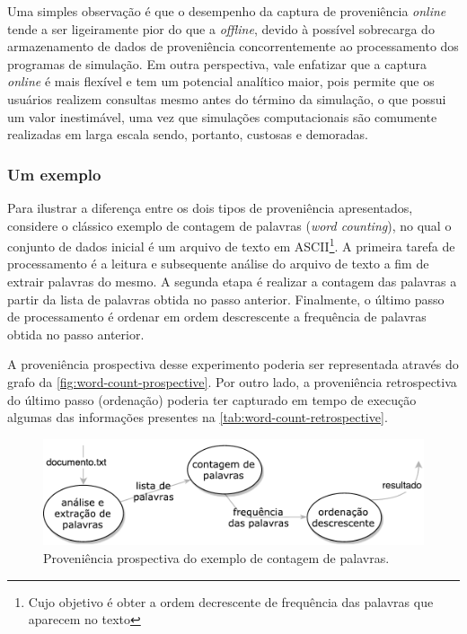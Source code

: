 Uma simples observação é que o desempenho da captura de proveniência \textit{online} tende a ser ligeiramente pior do que a \textit{offline}, devido à possível sobrecarga do armazenamento de dados de proveniência concorrentemente ao processamento dos programas de simulação. Em outra perspectiva, vale enfatizar que a captura \textit{online} é mais flexível e tem um potencial analítico maior, pois permite que os usuários realizem consultas mesmo antes do término da simulação, o que possui um valor inestimável, uma vez que simulações computacionais são comumente realizadas em larga escala sendo, portanto, custosas e demoradas.

\subsubsection{Um exemplo}

Para ilustrar a diferença entre os dois tipos de proveniência apresentados, considere o clássico exemplo de contagem de palavras (\textit{word counting}), no qual o conjunto de dados inicial é um arquivo de texto em  ASCII\footnote{Cujo objetivo é obter a ordem decrescente de frequência das palavras que aparecem no texto}. A primeira tarefa de processamento é a leitura e subsequente análise do arquivo de texto a fim de extrair palavras do mesmo. A segunda etapa é realizar a contagem das palavras a partir da lista de palavras obtida no passo anterior. Finalmente, o último passo de processamento é ordenar em ordem descrescente a frequência de palavras obtida no passo anterior.

A proveniência prospectiva desse experimento poderia ser representada através do grafo da \autoref{fig:word-count-prospective}. Por outro lado, a proveniência retrospectiva do último passo (ordenação) poderia ter capturado em tempo de execução algumas das informações presentes na \autoref{tab:word-count-retrospective}.

\begin{figure}[ht]
    \centering
    \includegraphics[width=\textwidth]{img/word-count-prospective}
    \caption[Proveniência prospectiva do exemplo de contagem de palavras]{Proveniência prospectiva do exemplo de contagem de palavras.}%
    \label{fig:word-count-prospective}
\end{figure}


